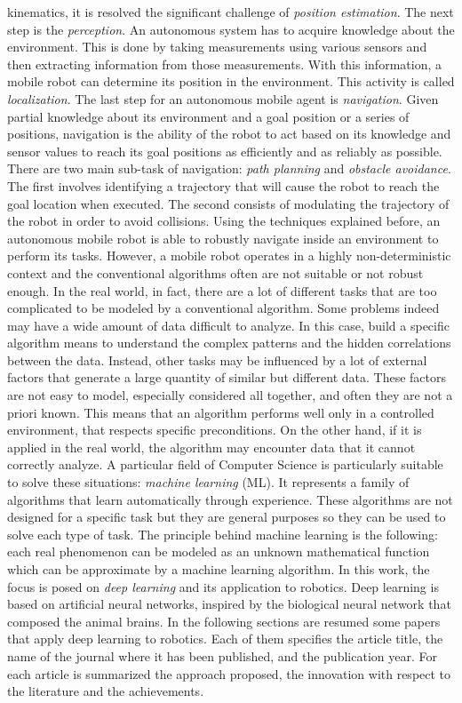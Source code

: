 kinematics, it is resolved the significant challenge of \emph{position
	estimation}. The next step is the \emph{perception}. An autonomous
system has to acquire knowledge about the environment. This is done by
taking measurements using various sensors and then extracting
information from those measurements. With this information, a mobile
robot can determine its position in the environment. This activity is
called \emph{localization}. The last step for an autonomous mobile agent
is \emph{navigation}. Given partial knowledge about its environment and
a goal position or a series of positions, navigation is the ability of
the robot to act based on its knowledge and sensor values to reach its
goal positions as efficiently and as reliably as possible. There are two
main sub-task of navigation: \emph{path planning} and \emph{obstacle
	avoidance}. The first involves identifying a trajectory that will cause
the robot to reach the goal location when executed. The second consists
of modulating the trajectory of the robot in order to avoid collisions.
Using the techniques explained before, an autonomous mobile robot is
able to robustly navigate inside an environment to perform its tasks.
However, a mobile robot operates in a highly non-deterministic context
and the conventional algorithms often are not suitable or not robust
enough. In the real world, in fact, there are a lot of different tasks
that are too complicated to be modeled by a conventional algorithm. Some
problems indeed may have a wide amount of data difficult to analyze. In
this case, build a specific algorithm means to understand the complex
patterns and the hidden correlations between the data. Instead, other
tasks may be influenced by a lot of external factors that generate a
large quantity of similar but different data. These factors are not easy
to model, especially considered all together, and often they are not a
priori known. This means that an algorithm performs well only in a
controlled environment, that respects specific preconditions. On the
other hand, if it is applied in the real world, the algorithm may
encounter data that it cannot correctly analyze. A particular field of
Computer Science is particularly suitable to solve these situations:
\emph{machine learning} (ML). It represents a family of algorithms that
learn automatically through experience. These algorithms are not
designed for a specific task but they are general purposes so they can
be used to solve each type of task. The principle behind machine
learning is the following: each real phenomenon can be modeled as an
unknown mathematical function which can be approximate by a machine
learning algorithm. In this work, the focus is posed on \emph{deep
	learning} and its application to robotics. Deep learning is based on
artificial neural networks, inspired by the biological neural network
that composed the animal brains. In the following sections are resumed
some papers that apply deep learning to robotics. Each of them specifies
the article title, the name of the journal where it has been published,
and the publication year. For each article is summarized the approach
proposed, the innovation with respect to the literature and the
achievements.